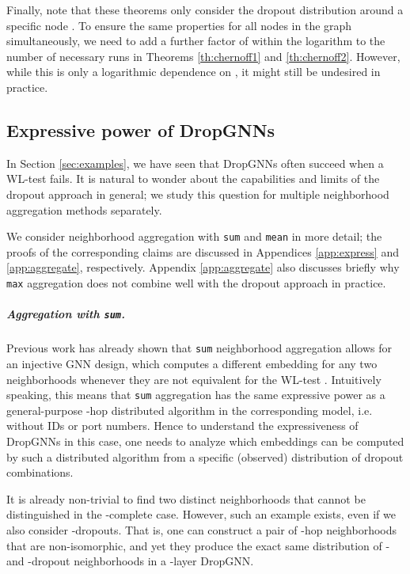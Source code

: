 \documentclass{article}
\begin{document}
Finally, note that these theorems only consider the dropout distribution around a specific node . To ensure the same properties for all  nodes in the graph simultaneously, we need to add a further factor of  within the logarithm to the number of necessary runs in Theorems \ref{th:chernoff1} and \ref{th:chernoff2}. However, while this is only a logarithmic dependence on , it might still be undesired in practice.

\subsection{Expressive power of DropGNNs} \label{sec:power}

In Section \ref{sec:examples}, we have seen that DropGNNs often succeed when a WL-test fails. It is natural to wonder about the capabilities and limits of the dropout approach in general; we study this question for multiple neighborhood aggregation methods separately.

We consider neighborhood aggregation with \texttt{sum} and \texttt{mean} in more detail; the proofs of the corresponding claims are discussed in Appendices \ref{app:express} and \ref{app:aggregate}, respectively. Appendix \ref{app:aggregate} also discusses briefly why \texttt{max} aggregation does not combine well with the dropout approach in practice.

\subparagraph*{Aggregation with \texttt{sum}.}

Previous work has already shown that \texttt{sum} neighborhood aggregation allows for an injective GNN design, which computes a different embedding for any two neighborhoods whenever they are not equivalent for the WL-test \citep{GIN}. Intuitively speaking, this means that \texttt{sum} aggregation has the same expressive power as a general-purpose -hop distributed algorithm in the corresponding model, i.e. without IDs or port numbers. Hence to understand the expressiveness of DropGNNs in this case, one needs to analyze which embeddings can be computed by such a distributed algorithm from a specific (observed) distribution of dropout combinations.

It is already non-trivial to find two distinct neighborhoods that cannot be distinguished in the -complete case. However, such an example exists, even if we also consider -dropouts. That is, one can construct a pair of -hop neighborhoods that are non-isomorphic, and yet they produce the exact same distribution of - and -dropout neighborhoods in a -layer DropGNN.
\end{document}
